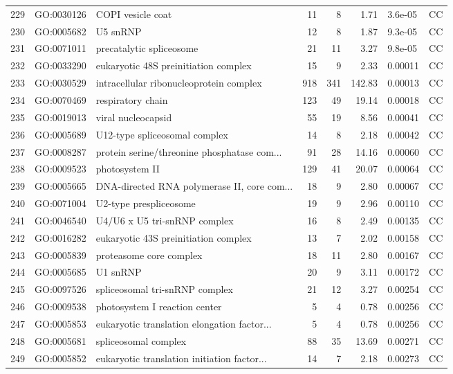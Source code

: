 \documentclass[12pt,oneside,a4paper]{article}
\begin{document}
\begin{longtable}{rllrrrll}
  229 & GO:0030126 & COPI vesicle coat &  11 &   8 & 1.71 & 3.6e-05 & CC \\ 
  230 & GO:0005682 & U5 snRNP &  12 &   8 & 1.87 & 9.3e-05 & CC \\ 
  231 & GO:0071011 & precatalytic spliceosome &  21 &  11 & 3.27 & 9.8e-05 & CC \\ 
  232 & GO:0033290 & eukaryotic 48S preinitiation complex &  15 &   9 & 2.33 & 0.00011 & CC \\ 
  233 & GO:0030529 & intracellular ribonucleoprotein complex & 918 & 341 & 142.83 & 0.00013 & CC \\ 
  234 & GO:0070469 & respiratory chain & 123 &  49 & 19.14 & 0.00018 & CC \\ 
  235 & GO:0019013 & viral nucleocapsid &  55 &  19 & 8.56 & 0.00041 & CC \\ 
  236 & GO:0005689 & U12-type spliceosomal complex &  14 &   8 & 2.18 & 0.00042 & CC \\ 
  237 & GO:0008287 & protein serine/threonine phosphatase com... &  91 &  28 & 14.16 & 0.00060 & CC \\ 
  238 & GO:0009523 & photosystem II & 129 &  41 & 20.07 & 0.00064 & CC \\ 
  239 & GO:0005665 & DNA-directed RNA polymerase II, core com... &  18 &   9 & 2.80 & 0.00067 & CC \\ 
  240 & GO:0071004 & U2-type prespliceosome &  19 &   9 & 2.96 & 0.00110 & CC \\ 
  241 & GO:0046540 & U4/U6 x U5 tri-snRNP complex &  16 &   8 & 2.49 & 0.00135 & CC \\ 
  242 & GO:0016282 & eukaryotic 43S preinitiation complex &  13 &   7 & 2.02 & 0.00158 & CC \\ 
  243 & GO:0005839 & proteasome core complex &  18 &  11 & 2.80 & 0.00167 & CC \\ 
  244 & GO:0005685 & U1 snRNP &  20 &   9 & 3.11 & 0.00172 & CC \\ 
  245 & GO:0097526 & spliceosomal tri-snRNP complex &  21 &  12 & 3.27 & 0.00254 & CC \\ 
  246 & GO:0009538 & photosystem I reaction center &   5 &   4 & 0.78 & 0.00256 & CC \\ 
  247 & GO:0005853 & eukaryotic translation elongation factor... &   5 &   4 & 0.78 & 0.00256 & CC \\ 
  248 & GO:0005681 & spliceosomal complex &  88 &  35 & 13.69 & 0.00271 & CC \\ 
  249 & GO:0005852 & eukaryotic translation initiation factor... &  14 &   7 & 2.18 & 0.00273 & CC \\ 

\end{longtable}
\end{document}
